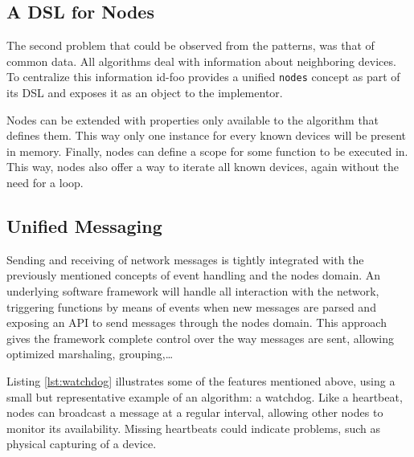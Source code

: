 \documentclass[conference]{IEEEtran}
\newcommand{\NAME}{id-foo\xspace}
\begin{document}
\subsection*{A DSL for Nodes}

The second problem that could be observed from the patterns, was that of common
data. All algorithms deal with information about neighboring devices. To
centralize this information \NAME provides a unified \texttt{nodes} concept as
part of its DSL and exposes it as an object to the implementor.

Nodes can be extended with properties only available to the algorithm that
defines them. This way only one instance for every known devices will be
present in memory. Finally, nodes can define a scope for some function to be
executed in. This way, nodes also offer a way to iterate all known devices,
again without the need for a loop.

\subsection*{Unified Messaging}

Sending and receiving of network messages is tightly integrated with the
previously mentioned concepts of event handling and the nodes domain. An
underlying software framework will handle all interaction with the network,
triggering functions by means of events when new messages are parsed and
exposing an API to send messages through the nodes domain. This approach gives
the framework complete control over the way messages are sent, allowing
optimized marshaling, grouping,\dots

Listing \ref{lst:watchdog} illustrates some of the features mentioned above,
using a small but representative example of an algorithm: a
watchdog\cite{mishra2004intrusion}. Like a heartbeat, nodes can broadcast a
message at a regular interval, allowing other nodes to monitor its
availability. Missing heartbeats could indicate problems, such as physical
capturing of a device.



\end{document}
